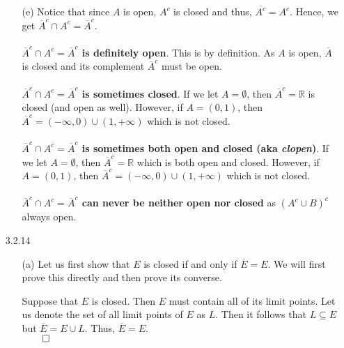 \documentclass[11pt]{article}
\newcommand{\reals}{\mathbb{R}}
\begin{document}
\begin{itemize}
\begin{itemize}
            \item[(e)]
                Notice that since $A$ is open, $A^c$ is closed and thus,
                $\overline{A^c} = A^c$. Hence, we get $\overline{A}^c \cap A^c
                = \overline{A}^c$.
                \\
                \\
                \textbf{$\overline{A}^c \cap A^c = \overline{A}^c$ is
                definitely open}.  This is by definition. As $A$ is open,
                $\overline{A}$ is closed and its complement $\overline{A}^c$
                must be open.
                \\
                \\
                \textbf{$\overline{A}^c \cap A^c = \overline{A}^c$ is sometimes
                closed}.  If we let $A = \emptyset$, then $\overline{A}^c =
                \reals$ is closed (and open as well). However, if $A = (0, 1)$,
                then $\overline{A}^c = (-\infty, 0) \cup (1, +\infty)$ which is
                not closed.
                \\
                \\
                \textbf{$\overline{A}^c \cap A^c = \overline{A}^c$ is sometimes
                both open and closed (aka \textit{clopen})}. If we let $A =
                \emptyset$, then $\overline{A}^c = \reals$ which is both open
                and closed. However, if $A = (0, 1)$, then $\overline{A}^c =
                (-\infty, 0) \cup (1, +\infty)$ which is not closed.
                \\
                \\
                \textbf{$\overline{A}^c \cap A^c = \overline{A}^c$ can never be
                neither open nor closed} as $(A^c \cup B)^c$ always open.
        \end{itemize}

    \newpage

    \item[3.2.14]
        \begin{itemize}
            \item[(a)]
                Let us first show that $E$ is closed if and only if
                $\overline{E} = E$. We will first prove this directly and then
                prove its converse.

                Suppose that $E$ is closed. Then $E$ must contain all of its
                limit points. Let us denote the set of all limit points of $E$
                as $L$. Then it follows that $L \subseteq E$ but $\overline{E}
                = E \cup L$. Thus, $\overline{E} = E$.\\
                $\qed$


\end{itemize}
\end{itemize}
\end{document}
